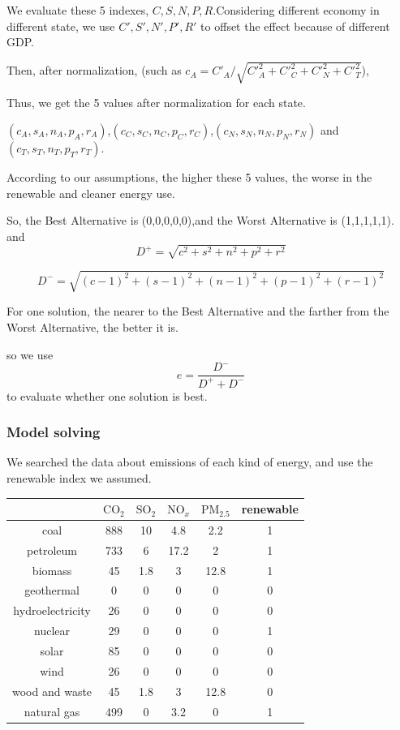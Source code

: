 \documentclass[12pt]{article}
\begin{document}
We evaluate these 5 indexes, $C,S,N,P,R$.Considering different economy in different state, we use $C',S',N',P',R'$ to offset the effect because of different GDP.

Then, after normalization, (such as $c_{A}=C'_{A}/\sqrt{C'^{2}_{A}+C'^{2}_{C}+C'^{2}_{N}+C'^{2}_{T}}$),

Thus, we get the 5 values after normalization for each state.

$(c_{A},s_{A},n_{A},p_{A},r_{A})$,$(c_{C},s_{C},n_{C},p_{C},r_{C})$,$(c_{N},s_{N},n_{N},p_{N},r_{N})$ and $(c_{T},s_{T},n_{T},p_{T},r_{T})$.

According to our assumptions, the higher these 5 values, the worse in the renewable and cleaner energy use.

So, the Best Alternative is (0,0,0,0,0),and the Worst Alternative is (1,1,1,1,1).
and $$D^{+}=\sqrt{c^{2}+s^{2}+n^{2}+p^{2}+r^{2}}$$

$$D^{-}=\sqrt{(c-1)^{2}+(s-1)^{2}+(n-1)^{2}+(p-1)^{2}+(r-1)^{2}}$$

For one solution, the nearer to the Best Alternative and the farther from the Worst Alternative, the better it is.

so we use $$e=\frac{D^{-}}{D^{+}+D^{-}}$$ to evaluate whether one solution is best.

\subsubsection{Model solving}

We searched the data about emissions of each kind of energy, and use the renewable index we assumed.

\begin{table}[h!]\centering\scriptsize
\begin{tabular}{|c|c|c|c|c|c| }
\hline
& $\mathrm{CO_{2}}$& $\mathrm{SO_{2}}$& $\mathrm{NO}_{x}$& $\mathrm{PM_{2.5}}$&renewable\\
\hline
coal	&888	&10	&4.8	&2.2	&1\\
\hline
petroleum	&733	&6	&17.2	&2	&1\\
\hline
biomass	&45&	1.8	&3	&12.8	&1\\
\hline
geothermal&	0	&0	&0	&0	&0\\
\hline
hydroelectricity&	26	&0	&0&0	&0\\
\hline
nuclear	&29&	0	&0	&0&	1\\
\hline
solar	&85&	0	&0	&0&0\\
\hline
wind	&26&	0	&0	&0	&0\\
\hline
wood and waste	&45	&1.8	&3	&12.8&	0\\
\hline
natural gas	&499	&0&	3.2&	0&	1\\

\hline
\end{tabular}
\end{table}
\end{document}
